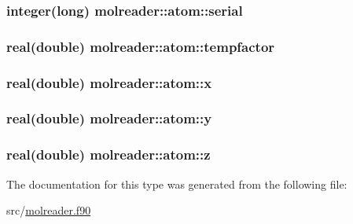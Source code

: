 \hypertarget{structmolreader_1_1atom_a4843d34d24db6a30c5c0c199d4a09cdb}{
\subsubsection[{serial}]{\setlength{\rightskip}{0pt plus 5cm}integer(long) molreader\+::atom\+::serial\hspace{0.3cm}{\ttfamily [private]}}}\label{structmolreader_1_1atom_a4843d34d24db6a30c5c0c199d4a09cdb}
\hypertarget{structmolreader_1_1atom_a07cd48fa61d17ae1319fa643fda2b160}{
\subsubsection[{tempfactor}]{\setlength{\rightskip}{0pt plus 5cm}real(double) molreader\+::atom\+::tempfactor\hspace{0.3cm}{\ttfamily [private]}}}\label{structmolreader_1_1atom_a07cd48fa61d17ae1319fa643fda2b160}
\hypertarget{structmolreader_1_1atom_a2fe09429b1c06d0037917dbc658f599c}{
\subsubsection[{x}]{\setlength{\rightskip}{0pt plus 5cm}real(double) molreader\+::atom\+::x\hspace{0.3cm}{\ttfamily [private]}}}\label{structmolreader_1_1atom_a2fe09429b1c06d0037917dbc658f599c}
\hypertarget{structmolreader_1_1atom_ad723df4b3102cd459daf1896014f5a1e}{
\subsubsection[{y}]{\setlength{\rightskip}{0pt plus 5cm}real(double) molreader\+::atom\+::y\hspace{0.3cm}{\ttfamily [private]}}}\label{structmolreader_1_1atom_ad723df4b3102cd459daf1896014f5a1e}
\hypertarget{structmolreader_1_1atom_ad68c754042ba9fd277d59c6caf9bc570}{
\subsubsection[{z}]{\setlength{\rightskip}{0pt plus 5cm}real(double) molreader\+::atom\+::z\hspace{0.3cm}{\ttfamily [private]}}}\label{structmolreader_1_1atom_ad68c754042ba9fd277d59c6caf9bc570}


The documentation for this type was generated from the following file\+:\begin{DoxyCompactItemize}
\item 
src/\hyperlink{molreader_8f90}{molreader.\+f90}\end{DoxyCompactItemize}
